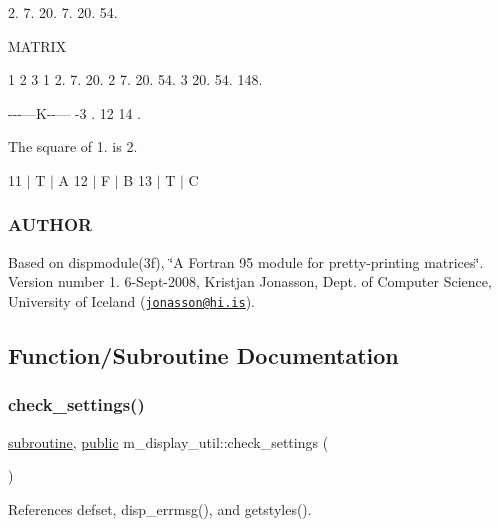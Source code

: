 2. 7. 20. 7. 20. 54. \begin{DoxyVerb}   MATRIX
\end{DoxyVerb}
 

 1 2 3 1 2. 7. 20. 2 7. 20. 54. 3 20. 54. 148.

-\/-\/-\/---K-\/-\/--- -\/3 . 12 14 .

The square of 1. is 2.

11 $\vert$ T $\vert$ A 12 $\vert$ F $\vert$ B 13 $\vert$ T $\vert$ C

\subsubsection*{A\+U\+T\+H\+OR}

Based on dispmodule(3f), \char`\"{}\+A Fortran 95 module for pretty-\/printing matrices\char`\"{}. Version number 1. 6-\/\+Sept-\/2008, Kristjan Jonasson, Dept. of Computer Science, University of Iceland (\href{mailto:jonasson@hi.is}{\tt jonasson@hi.\+is}). 

\subsection{Function/\+Subroutine Documentation}
\mbox{\label{namespacem__display__util_ad15e85a03cd2a7ef8f405fbb9c1061af}} 
\subsubsection{\texorpdfstring{check\+\_\+settings()}{check\_settings()}}
{\footnotesize\ttfamily \hyperlink{M__stopwatch_83_8txt_acfbcff50169d691ff02d4a123ed70482}{subroutine}, \hyperlink{M__stopwatch_83_8txt_a2f74811300c361e53b430611a7d1769f}{public} m\+\_\+display\+\_\+util\+::check\+\_\+settings (\begin{DoxyParamCaption}{ }\end{DoxyParamCaption})}



References defset, disp\+\_\+errmsg(), and getstyles().

